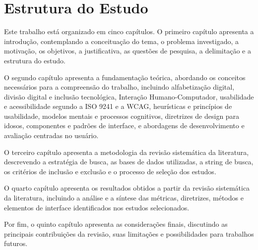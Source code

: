 \section{Estrutura do Estudo}

Este trabalho está organizado em cinco capítulos. O primeiro capítulo apresenta a introdução, contemplando a conceituação do tema, o problema investigado, a motivação, os objetivos, a justificativa, as questões de pesquisa, a delimitação e a estrutura do estudo.

O segundo capítulo apresenta a fundamentação teórica, abordando os conceitos necessários para a compreensão do trabalho, incluindo alfabetização digital, divisão digital e inclusão tecnológica, Interação Humano-Computador, usabilidade e acessibilidade segundo a ISO 9241 e a WCAG, heurísticas e princípios de usabilidade, modelos mentais e processos cognitivos, diretrizes de design para idosos, componentes e padrões de interface, e abordagens de desenvolvimento e avaliação centradas no usuário.

O terceiro capítulo apresenta a metodologia da revisão sistemática da literatura, descrevendo a estratégia de busca, as bases de dados utilizadas, a string de busca, os critérios de inclusão e exclusão e o processo de seleção dos estudos.

O quarto capítulo apresenta os resultados obtidos a partir da revisão sistemática da literatura, incluindo a análise e a síntese das métricas, diretrizes, métodos e elementos de interface identificados nos estudos selecionados.

Por fim, o quinto capítulo apresenta as considerações finais, discutindo as principais contribuições da revisão, suas limitações e possibilidades para trabalhos futuros.